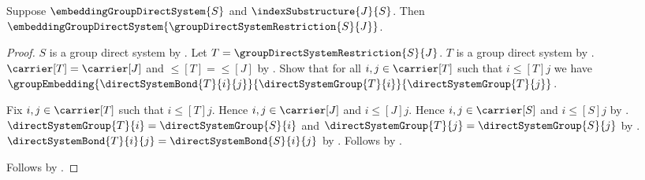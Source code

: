 \begin{theorem}\label{embedding_group_direct_system_restriction}
    Suppose $\embeddingGroupDirectSystem{S}$ and
        $\indexSubstructure{J}{S}$.
    Then $\embeddingGroupDirectSystem
        {\groupDirectSystemRestriction{S}{J}}$.
\end{theorem}
\begin{proof}
    $S$ is a group direct system by
        .
    Let $T=\groupDirectSystemRestriction{S}{J}$.
    $T$ is a group direct system by
        .
    $\carrier[T]=\carrier[J]$ and $\leq[T]=\leq[J]$ by
        .
    Show that for all $i,j\in\carrier[T]$ such that
        $i\mathrel{\leq[T]}j$ we have
        $\groupEmbedding
            {\directSystemBond{T}{i}{j}}
            {\directSystemGroup{T}{i}}
            {\directSystemGroup{T}{j}}$.
    \begin{subproof}
        Fix $i,j\in\carrier[T]$ such that $i\mathrel{\leq[T]}j$.
        Hence $i,j\in\carrier[J]$ and
            $i\mathrel{\leq[J]}j$.
        Hence $i,j\in\carrier[S]$ and
            $i\mathrel{\leq[S]}j$ by
            .
        $\directSystemGroup{T}{i}=\directSystemGroup{S}{i}$ and
            $\directSystemGroup{T}{j}=\directSystemGroup{S}{j}$ by
            .
        $\directSystemBond{T}{i}{j}=\directSystemBond{S}{i}{j}$ by
            .
        Follows by .
    \end{subproof}
    Follows by .
\end{proof}
